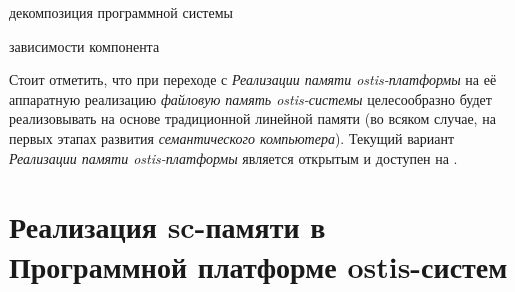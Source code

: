 \begin{SCn}
\begin{scnrelfromset}{декомпозиция программной системы}
\end{scnrelfromset}
\begin{scnrelfromset}{зависимости компонента}
\end{scnrelfromset}
\end{SCn}

Стоит отметить, что при переходе с \textit{Реализации памяти ostis-платформы} на её аппаратную реализацию \textit{файловую память ostis-системы} целесообразно будет реализовывать на основе традиционной линейной памяти (во всяком случае, на первых этапах развития \textit{семантического компьютера}). Текущий вариант \textit{Реализации памяти ostis-платформы} является открытым и доступен на .

\section{Реализация sc-памяти в Программной платформе ostis-систем}
\label{sec_soft_platform_sc_memory}

